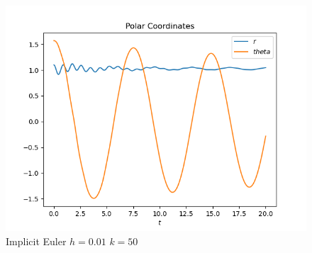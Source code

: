 \documentclass{report}
\begin{document}
\begin{figure}[h]
\centering
\begin{minipage}[b]{0.45\textwidth}
\centering
\includegraphics[width=\textwidth]{../Plots/ImpEuler/imp_euler_h=0.01_k=50_c}
\caption{Implicit Euler $h=0.01$ $k=50$}
\label{imp_euler_h=0.01_k=50_c}
\end{minipage}
\end{figure}
\end{document}
